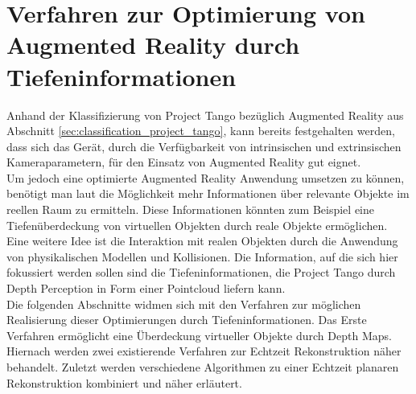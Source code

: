 \chapter{Verfahren zur Optimierung von Augmented Reality durch Tiefeninformationen}

Anhand der Klassifizierung von Project Tango bezüglich Augmented Reality aus Abschnitt \ref{sec:classification_project_tango}, kann bereits festgehalten werden, dass sich das Gerät, durch die Verfügbarkeit von intrinsischen und extrinsischen Kameraparametern, für den Einsatz von Augmented Reality gut eignet. \\ 

Um jedoch eine optimierte Augmented Reality Anwendung umsetzen zu können, benötigt man laut \citet{azuma2001recent} die Möglichkeit mehr Informationen über relevante Objekte im reellen Raum zu ermitteln. Diese Informationen könnten zum Beispiel eine Tiefenüberdeckung von virtuellen Objekten durch reale Objekte ermöglichen. Eine weitere Idee ist die Interaktion mit realen Objekten durch die Anwendung von physikalischen Modellen und Kollisionen. Die Information, auf die sich hier fokussiert werden sollen sind die Tiefeninformationen, die Project Tango durch Depth Perception in Form einer Pointcloud liefern kann.\\

Die folgenden Abschnitte widmen sich mit den Verfahren zur möglichen Realisierung dieser Optimierungen durch Tiefeninformationen. Das Erste Verfahren ermöglicht eine Überdeckung virtueller Objekte durch Depth Maps. Hiernach werden zwei existierende Verfahren zur Echtzeit Rekonstruktion näher behandelt. Zuletzt werden verschiedene Algorithmen zu einer Echtzeit planaren Rekonstruktion kombiniert und näher erläutert. \\






